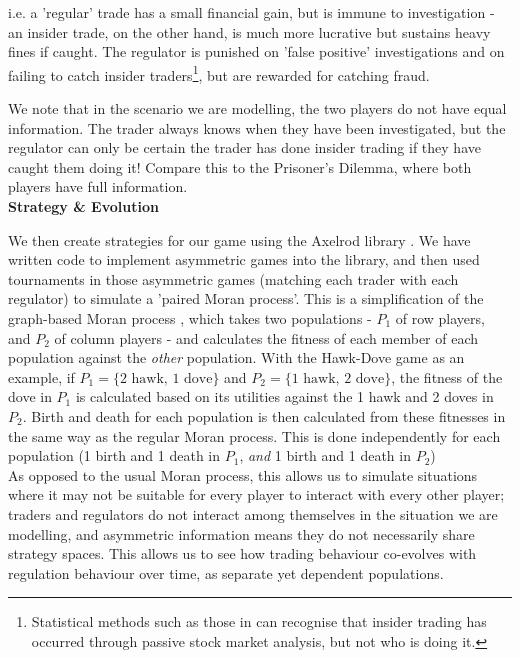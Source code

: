 \documentclass{article}
\begin{document}
i.e. a 'regular' trade has a small financial gain, but is immune to investigation - an insider trade, on the other hand, is much more lucrative but sustains heavy fines if caught. The regulator is punished on 'false positive' investigations and on failing to catch insider traders\footnote[2]{Statistical methods such as those in \citet{bris2005insider} can recognise that insider trading has occurred through passive stock market analysis, but not who is doing it.}, but are rewarded for catching fraud. 

We note that in the scenario we are modelling, the two players do not have equal information. The trader always knows when they have been investigated, but the regulator can only be certain the trader has done insider trading if they have caught them doing it! Compare this to the Prisoner's Dilemma, where both players have full information.\\

\noindent\textbf{Strategy \& Evolution}

We then create strategies for our game using the Axelrod library \citep{axelrodproject}. We have written code to implement asymmetric games into the library, and then used tournaments in those asymmetric games (matching each trader with each regulator) to simulate a 'paired Moran process'. This is a simplification of the graph-based Moran process \citep{shakarian2013novel}, which takes two populations - $P_1$ of row players, and $P_2$ of column players - and calculates the fitness of each member of each population against the \emph{other} population. With the Hawk-Dove game as an example, if $P_1 = \{\text{2 hawk, 1 dove}\}$ and $P_2 = \{\text{1 hawk, 2 dove}\}$, the fitness of the dove in $P_1$ is calculated based on its utilities against the 1 hawk and 2 doves in $P_2$. Birth and death for each population is then calculated from these fitnesses in the same way as the regular Moran process. This is done independently for each population (1 birth and 1 death in $P_1$, \emph{and} 1 birth and 1 death in $P_2$)
\\

As opposed to the usual Moran process, this allows us to simulate situations where it may not be suitable for every player to interact with every other player; traders and regulators do not interact among themselves in the situation we are modelling, and asymmetric information means they do not necessarily share strategy spaces. This allows us to see how trading behaviour co-evolves with regulation behaviour over time, as separate yet dependent populations.
\end{document}
